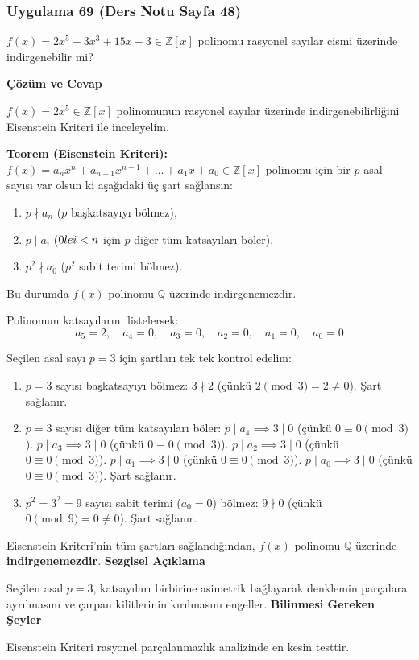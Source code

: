 \documentclass[11pt, a4paper]{article}
\newenvironment{cozum}{
    \vspace{0.5cm}
    \noindent\textcolor{green!60!black}{\faCheckCircle\enspace \textbf{\Large Çözüm ve Cevap}}\par\vspace{0.2cm}
}{}
\newenvironment{sezgisel}{
    \vspace{0.5cm}
    \noindent\textcolor{orange!80!black}{\faLightbulb\enspace \textbf{\Large Sezgisel Açıklama}}\par\vspace{0.2cm}
    \itshape
}{}
\newenvironment{bilgi}{
    \vspace{0.5cm}
    \noindent\textcolor{red!70!black}{\faExclamationTriangle\enspace \textbf{\Large Bilinmesi Gereken Şeyler}}\par\vspace{0.2cm}
}{}
\begin{document}
\newpage
\subsubsection{Uygulama 69 (Ders Notu Sayfa 48)}
\begin{sorubox}
$f(x) = 2x^5 - 3x^3 + 15x - 3 \in \mathbb{Z}[x]$ polinomu rasyonel sayılar cismi üzerinde indirgenebilir mi?
\end{sorubox}
\begin{cozum}
$f(x) = 2x^{5} \in \mathbb{Z}[x]$ polinomunun rasyonel sayılar üzerinde indirgenebilirliğini Eisenstein Kriteri ile inceleyelim.

\textbf{Teorem (Eisenstein Kriteri):} $f(x) = a_n x^n + a_{n-1} x^{n-1} + \dots + a_1 x + a_0 \in \mathbb{Z}[x]$ polinomu için bir $p$ asal sayısı var olsun ki aşağıdaki üç şart sağlansın:
\begin{enumerate}
    \item $p \nmid a_n$ ($p$ başkatsayıyı bölmez),
    \item $p \mid a_i$ ($0 \\le i < n$ için $p$ diğer tüm katsayıları böler),
    \item $p^2 \nmid a_0$ ($p^2$ sabit terimi bölmez).
\end{enumerate}
Bu durumda $f(x)$ polinomu $\mathbb{Q}$ üzerinde indirgenemezdir.

Polinomun katsayılarını listelersek:
\[ a_{5} = 2, \quad a_{4} = 0, \quad a_{3} = 0, \quad a_{2} = 0, \quad a_{1} = 0, \quad a_{0} = 0 \]

Seçilen asal sayı $p = 3$ için şartları tek tek kontrol edelim:
\begin{enumerate}
    \item $p = 3$ sayısı başkatsayıyı bölmez: $3 \nmid 2$ (çünkü $2 \pmod{3} = 2 \neq 0$). Şart sağlanır.
    \item $p = 3$ sayısı diğer tüm katsayıları böler:
    $p \mid a_{4} \implies 3 \mid 0$ (çünkü $0 \equiv 0 \pmod{3}$).
    $p \mid a_{3} \implies 3 \mid 0$ (çünkü $0 \equiv 0 \pmod{3}$).
    $p \mid a_{2} \implies 3 \mid 0$ (çünkü $0 \equiv 0 \pmod{3}$).
    $p \mid a_{1} \implies 3 \mid 0$ (çünkü $0 \equiv 0 \pmod{3}$).
    $p \mid a_{0} \implies 3 \mid 0$ (çünkü $0 \equiv 0 \pmod{3}$).
    Şart sağlanır.
    \item $p^2 = 3^2 = 9$ sayısı sabit terimi ($a_0 = 0$) bölmez: $9 \nmid 0$ (çünkü $0 \pmod{9} = 0 \neq 0$). Şart sağlanır.
\end{enumerate}

Eisenstein Kriteri'nin tüm şartları sağlandığından, $f(x)$ polinomu $\mathbb{Q}$ üzerinde \textbf{indirgenemezdir}.
\end{cozum}
\begin{sezgisel}
Seçilen asal $p=3$, katsayıları birbirine asimetrik bağlayarak denklemin parçalara ayrılmasını ve çarpan kilitlerinin kırılmasını engeller.
\end{sezgisel}
\begin{bilgi}
Eisenstein Kriteri rasyonel parçalanmazlık analizinde en kesin testtir.
\end{bilgi}
\end{document}
